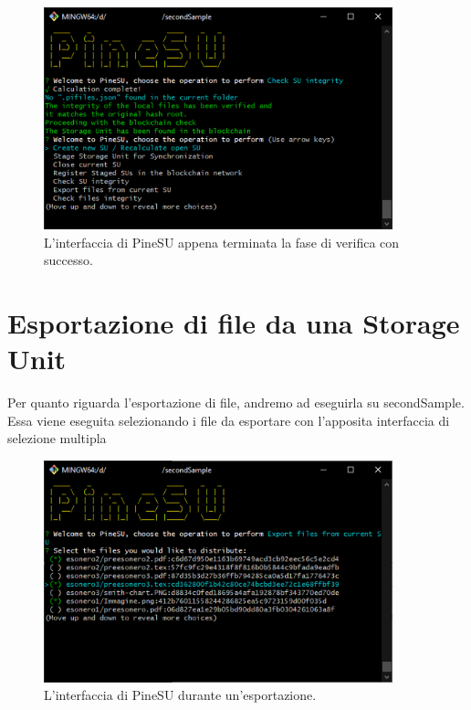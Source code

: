 \begin{figure}[H]
    \centering
    \includegraphics[width=0.9\textwidth]{Figures/verify}
    \caption{\small{
    L'interfaccia di PineSU appena terminata la fase di verifica con successo.
    } %
    } %
    \label{fi:ver}
\end{figure}
\newpage

\section{Esportazione di file da una Storage Unit}
\label{sub:exp}
Per quanto riguarda l'esportazione di file, andremo ad eseguirla su \textsf{secondSample}.
Essa viene eseguita selezionando i file da esportare con l'apposita interfaccia
di selezione multipla
\begin{figure}[H]
    \centering
    \includegraphics[width=0.9\textwidth]{Figures/export}
    \caption{\small{
    L'interfaccia di PineSU durante un'esportazione.
    } %
    } %
    \label{fi:exp}
\end{figure}

